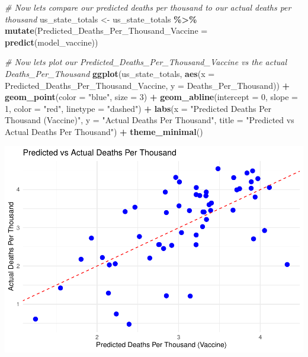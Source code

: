\documentclass[
]{article}
\newenvironment{Shaded}{\begin{snugshade}}{\end{snugshade}}
\newcommand{\AttributeTok}[1]{\textcolor[rgb]{0.13,0.29,0.53}{#1}}
\newcommand{\CommentTok}[1]{\textcolor[rgb]{0.56,0.35,0.01}{\textit{#1}}}
\newcommand{\DecValTok}[1]{\textcolor[rgb]{0.00,0.00,0.81}{#1}}
\newcommand{\FunctionTok}[1]{\textcolor[rgb]{0.13,0.29,0.53}{\textbf{#1}}}
\newcommand{\NormalTok}[1]{#1}
\newcommand{\OtherTok}[1]{\textcolor[rgb]{0.56,0.35,0.01}{#1}}
\newcommand{\SpecialCharTok}[1]{\textcolor[rgb]{0.81,0.36,0.00}{\textbf{#1}}}
\newcommand{\StringTok}[1]{\textcolor[rgb]{0.31,0.60,0.02}{#1}}
\begin{document}
\begin{Shaded}
\begin{Highlighting}[]
\CommentTok{\# Now lets compare our predicted deaths per thousand to our actual deaths per thousand}
\NormalTok{us\_state\_totals }\OtherTok{\textless{}{-}}\NormalTok{ us\_state\_totals }\SpecialCharTok{\%\textgreater{}\%}
  \FunctionTok{mutate}\NormalTok{(}\AttributeTok{Predicted\_Deaths\_Per\_Thousand\_Vaccine =} \FunctionTok{predict}\NormalTok{(model\_vaccine))}

\CommentTok{\# Now lets plot our Predicted\_Deaths\_Per\_Thousand\_Vaccine vs the actual Deaths\_Per\_Thousand}
\FunctionTok{ggplot}\NormalTok{(us\_state\_totals, }\FunctionTok{aes}\NormalTok{(}\AttributeTok{x =}\NormalTok{ Predicted\_Deaths\_Per\_Thousand\_Vaccine, }\AttributeTok{y =}\NormalTok{ Deaths\_Per\_Thousand)) }\SpecialCharTok{+}
  \FunctionTok{geom\_point}\NormalTok{(}\AttributeTok{color =} \StringTok{"blue"}\NormalTok{, }\AttributeTok{size =} \DecValTok{3}\NormalTok{) }\SpecialCharTok{+}
  \FunctionTok{geom\_abline}\NormalTok{(}\AttributeTok{intercept =} \DecValTok{0}\NormalTok{, }\AttributeTok{slope =} \DecValTok{1}\NormalTok{, }\AttributeTok{color =} \StringTok{"red"}\NormalTok{, }\AttributeTok{linetype =} \StringTok{"dashed"}\NormalTok{) }\SpecialCharTok{+}
  \FunctionTok{labs}\NormalTok{(}\AttributeTok{x =} \StringTok{"Predicted Deaths Per Thousand (Vaccine)"}\NormalTok{,}
       \AttributeTok{y =} \StringTok{"Actual Deaths Per Thousand"}\NormalTok{,}
       \AttributeTok{title =} \StringTok{"Predicted vs Actual Deaths Per Thousand"}\NormalTok{) }\SpecialCharTok{+}
  \FunctionTok{theme\_minimal}\NormalTok{()}
\end{Highlighting}
\end{Shaded}

\includegraphics{covid-data-analysis_files/figure-latex/model-with-vaccine-1.pdf}
\end{document}
